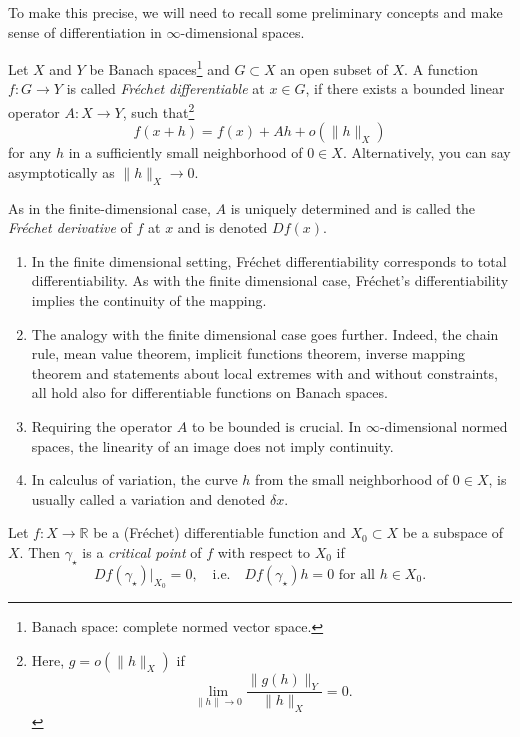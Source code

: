 \documentclass[english,fontsize=11pt,paper=a5,oneside]{scrbook}
\newcommand{\R}{\mathbb{R}}
\theoremstyle{definition}
\newenvironment{remark}
  {\pushQED{\qed}\renewcommand{\qedsymbol}{$\lozenge$}\remarkx}
  {\popQED\endremarkx}
\begin{document}
To make this precise, we will need to recall some preliminary concepts and make sense of differentiation in $\infty$-dimensional spaces.

Let $X$ and $Y$ be Banach spaces\footnote{Banach space: complete normed vector space.}  and $G\subset X$ an open subset of $X$.
A function $f: G \to Y$ is called \emph{Fr\'echet differentiable} at $x\in G$, if there exists a bounded linear operator $A: X \to Y$, such that\footnote{Here, $g = o(\|h\|_X)$ if
  \begin{equation}
    \lim_{\|h\| \to 0} \frac{\|g(h)\|_Y}{\|h\|_X} = 0.
  \end{equation}
}
\begin{equation}\label{eq:frechetdiff}
  f(x+h) = f(x) + Ah + o(\|h\|_X)
\end{equation}
for any $h$ in a sufficiently small neighborhood of $0\in X$. Alternatively, you can say asymptotically as $\|h\|_X\to 0$.

As in the finite-dimensional case, $A$ is uniquely determined and is called the \emph{Fr\'echet derivative} of $f$ at $x$ and is denoted $D f(x)$.

\begin{remark}
  \begin{enumerate}
    \item In the finite dimensional setting, Fr\'echet differentiability corresponds to total differentiability. As with the finite dimensional case, Fr\'echet's differentiability implies the continuity of the mapping.
    \item The analogy with the finite dimensional case goes further. Indeed, the chain rule, mean value theorem, implicit functions theorem, inverse mapping theorem and statements about local extremes with and without constraints, all hold also for differentiable functions on Banach spaces.
    \item Requiring the operator $A$ to be bounded is crucial. In $\infty$-dimensional normed spaces, the linearity of an image does not imply continuity.
    \item In calculus of variation, the curve $h$ from the small neighborhood of $0\in X$, is usually called a variation and denoted $\delta x$.
  \end{enumerate}
\end{remark}

Let $f: X \to \R$ be a (Fr\'echet) differentiable function and $X_0 \subset X$ be a subspace of $X$. Then $\gamma_\star$ is a \emph{critical point} of $f$ with respect to $X_0$ if
\begin{equation}
  Df(\gamma_\star)\Big|_{X_0} = 0, \quad\mbox{i.e.}\quad
  Df(\gamma_\star)h = 0 \mbox{ for all } h\in X_0.
\end{equation}
\end{document}
